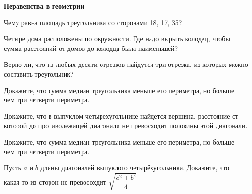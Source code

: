 \centerline{\bf \Huge Неравенства в геометрии}

\begin{flushright}
        \scriptsize{}
\end{flushright}


Чему равна площадь треугольника со сторонами 18, 17, 35?

Четыре дома расположены по окружности. Где надо вырыть колодец, чтобы сумма расстояний от домов до колодца была наименьшей?

Верно ли, что из любых десяти отрезков найдутся три отрезка, из которых можно составить треугольник?

Докажите, что сумма медиан треугольника меньше его периметра, но больше, чем три
четверти периметра.

Докажите, что в выпуклом четырехугольнике найдется вершина, расстояние от которой до противолежащей диагонали не превосходит половины этой диагонали.

Докажите, что сумма медиан треугольника меньше его периметра, но больше, чем три
четверти периметра.

Пусть $a$ и $b$ длины диагоналей выпуклого четырёхугольника. Докажите, что какая-то из сторон не превосохдит $\sqrt{\dfrac{a^2+b^2}{4}}$